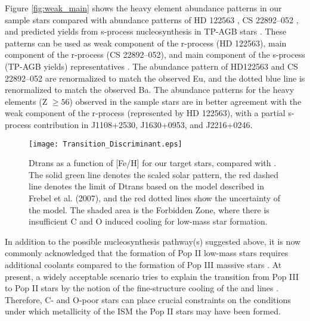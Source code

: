 Figure \ref{fig:weak_main} shows the heavy element abundance patterns in our
sample stars compared with abundance patterns of HD 122563 \citep[the dashed
gray line,][]{2006ApJ...643.1180H, 2012ApJS..203...27R}, CS 22892–052 \citep[the
solid red line,][]{2003ApJ...591..936S, 2009ApJS..182...80S,
2009ApJ...698.1963R}, and predicted yields from s-process nucleosynthesis in
TP-AGB stars \citep[the dotted blue line,][]{2008ARA&A..46..241S,
2011MNRAS.418..284B}. These patterns can be used as weak component of
the r-process (HD 122563), main component of the r-process (CS 22892–052), and
main component of the s-process (TP-AGB yields) representatives
\citep{2014ApJ...784..158R}. The abundance pattern of HD122563 and CS 22892–052
are renormalized to match the observed Eu, and the dotted blue line is
renormalized to match the observed Ba. The abundance patterns for the heavy
elements (Z $\geqslant 56$) observed in the sample stars are in better agreement
with the weak component of the r-process (represented by HD 122563), with a
partial s-process contribution in J1108+2530, J1630+0953, and J2216+0246.


\begin{figure}[!ht]
\centering
\texttt{[image: Transition\_Discriminant.eps]} 
\caption{Dtrans as a function of [Fe/H] for our target stars, compared
with \citet{2013ApJ...762...26Y}. The solid green line denotes the scaled solar
pattern, the red dashed line denotes the limit of Dtrans based on the model
described in Frebel et al. (2007), and the red dotted lines show the uncertainty
of the model. The shaded area is the Forbidden Zone, where there is insufficient
C and O induced cooling for low-mass star formation.}
\label{fig:dtrans}
\end{figure}
  
In addition to the possible nucleosynthesis pathway(s) suggested above, it is
now commonly acknowledged that the formation of Pop II low-mass stars requires
additional coolants compared to the formation of Pop III massive stars
\citep[e.g.,][]{2006ApJ...652....6Y, 2013ASSL..396..103G, 2015ComAC...2....3G}.
At present, a widely acceptable scenario tries to explain the transition from
Pop III to Pop II stars by the notion of the fine-structure cooling of the
 and  lines \citep[e.g.,][]{2003Natur.425..812B,
2006ApJ...643...26S}. Therefore, C- and O-poor stars can place crucial
constraints on the conditions under which metallicity of the ISM the Pop II
stars may have been formed. 

